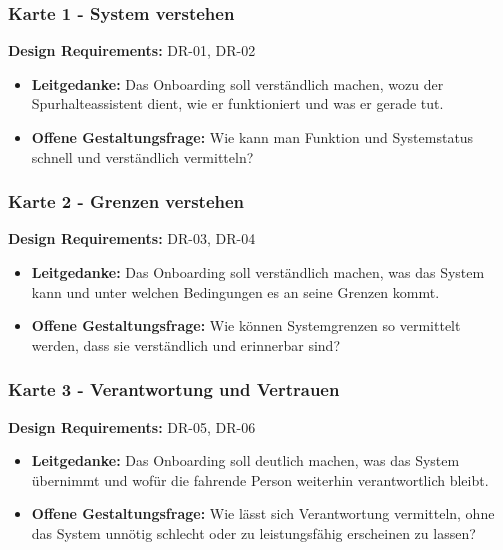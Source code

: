 \subsubsection*{Karte 1 - System verstehen}

\noindent
\textbf{Design Requirements:} DR-01, DR-02

\begin{itemize}
    \item \textbf{Leitgedanke:}
    Das Onboarding soll verständlich machen, wozu der
    Spurhalteassistent dient, wie er funktioniert und was er gerade tut.

    \item \textbf{Offene Gestaltungsfrage:}
    Wie kann man Funktion und Systemstatus schnell und verständlich
    vermitteln?
\end{itemize}

\subsubsection*{Karte 2 - Grenzen verstehen}

\noindent
\textbf{Design Requirements:} DR-03, DR-04

\begin{itemize}
    \item \textbf{Leitgedanke:}
    Das Onboarding soll verständlich machen, was das System kann und
    unter welchen Bedingungen es an seine Grenzen kommt.

    \item \textbf{Offene Gestaltungsfrage:}
    Wie können Systemgrenzen so vermittelt werden, dass sie verständlich
    und erinnerbar sind?
\end{itemize}

\subsubsection*{Karte 3 - Verantwortung und Vertrauen}

\noindent
\textbf{Design Requirements:} DR-05, DR-06

\begin{itemize}
    \item \textbf{Leitgedanke:}
    Das Onboarding soll deutlich machen, was das System übernimmt und
    wofür die fahrende Person weiterhin verantwortlich bleibt.

    \item \textbf{Offene Gestaltungsfrage:}
    Wie lässt sich Verantwortung vermitteln, ohne das System unnötig
    schlecht oder zu leistungsfähig erscheinen zu lassen?
\end{itemize}

